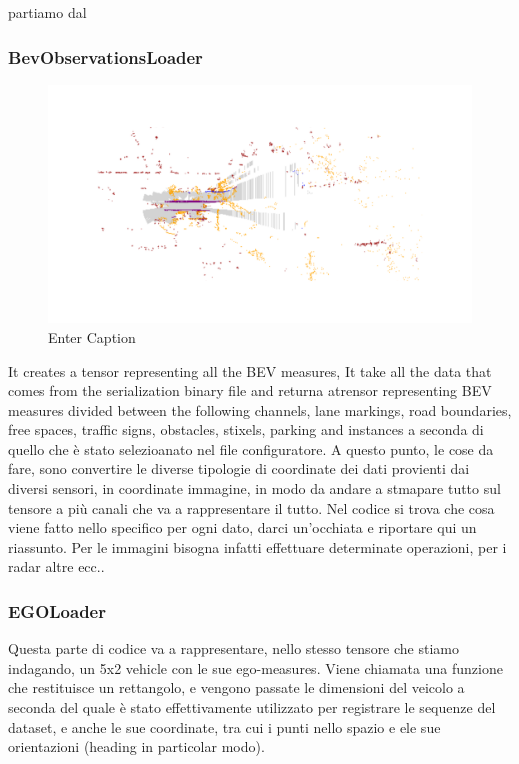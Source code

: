 partiamo dal

\subsubsection{BevObservationsLoader}

\begin{figure}
    \centering
    \includegraphics[width=1\linewidth]{LateX//figs/bevLoader.pdf}
    \caption{Enter Caption}
    \label{fig:enter-label}
\end{figure}

It creates a tensor representing all the BEV measures, It take all the data that comes from the serialization binary file and returna atrensor representing BEV measures divided between the following channels, lane markings, road boundaries, free spaces, traffic signs, obstacles, stixels, parking and instances a seconda di quello che è stato selezioanato nel file configuratore. 
A questo punto, le cose da fare, sono convertire le diverse tipologie di coordinate dei dati provienti dai diversi sensori, in coordinate immagine, in modo da andare a stmapare tutto sul tensore a più canali che va a rappresentare il tutto. 
Nel codice si trova che cosa viene fatto nello specifico per ogni dato, darci un'occhiata e riportare qui un riassunto. 
Per le immagini bisogna infatti effettuare determinate operazioni, per i radar altre ecc..

\subsubsection{EGOLoader}
Questa parte di codice va a rappresentare, nello stesso tensore che stiamo indagando, un 5x2 vehicle con le sue ego-measures. 
Viene chiamata una funzione che restituisce un rettangolo, e vengono passate le dimensioni del veicolo a seconda del quale è stato effettivamente utilizzato per registrare le sequenze del dataset, e anche le sue coordinate, tra cui i punti nello spazio e ele sue orientazioni (heading in particolar modo). 

